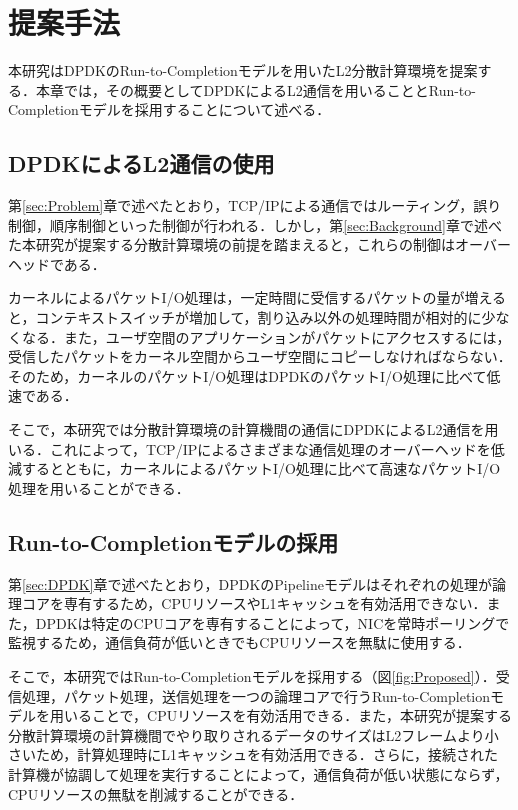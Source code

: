 \section{提案手法}
\label{sec:Proposed}
本研究はDPDKのRun-to-Completionモデルを用いたL2分散計算環境を提案する．本章では，その概要としてDPDKによるL2通信を用いることとRun-to-Completionモデルを採用することについて述べる．

\subsection{DPDKによるL2通信の使用}
第\ref{sec:Problem}章で述べたとおり，TCP/IPによる通信ではルーティング，誤り制御，順序制御といった制御が行われる．しかし，第\ref{sec:Background}章で述べた本研究が提案する分散計算環境の前提を踏まえると，これらの制御はオーバーヘッドである．

カーネルによるパケットI/O処理は，一定時間に受信するパケットの量が増えると，コンテキストスイッチが増加して，割り込み以外の処理時間が相対的に少なくなる．また，ユーザ空間のアプリケーションがパケットにアクセスするには，受信したパケットをカーネル空間からユーザ空間にコピーしなければならない．そのため，カーネルのパケットI/O処理はDPDKのパケットI/O処理に比べて低速である．

そこで，本研究では分散計算環境の計算機間の通信にDPDKによるL2通信を用いる．これによって，TCP/IPによるさまざまな通信処理のオーバーヘッドを低減するとともに，カーネルによるパケットI/O処理に比べて高速なパケットI/O処理を用いることができる．

\subsection{Run-to-Completionモデルの採用}
第\ref{sec:DPDK}章で述べたとおり，DPDKのPipelineモデルはそれぞれの処理が論理コアを専有するため，CPUリソースやL1キャッシュを有効活用できない．また，DPDKは特定のCPUコアを専有することによって，NICを常時ポーリングで監視するため，通信負荷が低いときでもCPUリソースを無駄に使用する．

そこで，本研究ではRun-to-Completionモデルを採用する（図\ref{fig:Proposed}）．受信処理，パケット処理，送信処理を一つの論理コアで行うRun-to-Completionモデルを用いることで，CPUリソースを有効活用できる．また，本研究が提案する分散計算環境の計算機間でやり取りされるデータのサイズはL2フレームより小さいため，計算処理時にL1キャッシュを有効活用できる．さらに，接続された計算機が協調して処理を実行することによって，通信負荷が低い状態にならず，CPUリソースの無駄を削減することができる．

